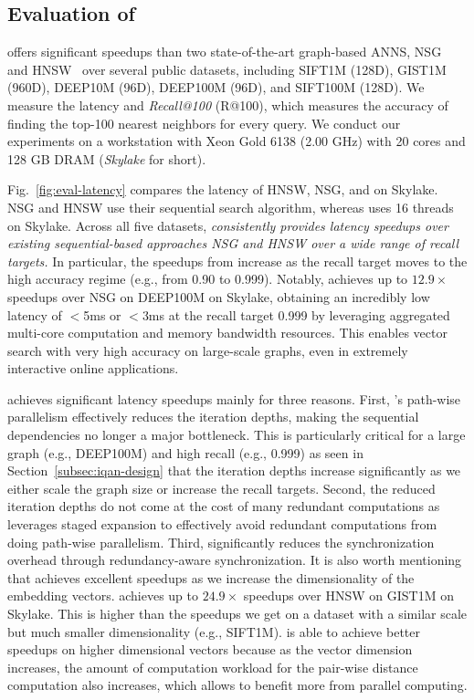 \subsection{Evaluation of \Hammer}
\label{subsec:iqan-eval}

\Hammer offers significant speedups than two state-of-the-art graph-based ANNS, NSG~\cite{NSGGithub,nsg} and HNSW~\cite{HNSWGithub,hnsw} over several public datasets, including SIFT1M (128D), GIST1M (960D), DEEP10M (96D), DEEP100M (96D), and SIFT100M (128D). We measure the latency and \emph{Recall@100} (R@100), which measures the accuracy of finding the top-100 nearest neighbors for every query.
We conduct our experiments on a workstation with Xeon Gold 6138 (2.00 GHz) with 20 cores and 128 GB DRAM (\emph{Skylake} for short). 

Fig.~\ref{fig:eval-latency} compares the latency of HNSW, NSG, and \Hammer on Skylake. NSG and HNSW use their sequential search algorithm, whereas \Hammer uses 16 threads on Skylake. Across all five datasets, \emph{\Hammer consistently provides latency speedups over existing sequential-based approaches NSG and HNSW over a wide range of recall targets. }
In particular, the speedups from \Hammer increase as the recall target moves to the high accuracy regime (e.g., from 0.90 to 0.999).
Notably, \Hammer achieves up to $12.9\times$ speedups over NSG on DEEP100M on Skylake, obtaining an incredibly low latency of $<$5ms or $<$3ms at the recall target 0.999 by leveraging aggregated multi-core computation and memory bandwidth resources. This enables vector search with very high accuracy on large-scale graphs, even in extremely interactive online applications. 

\Hammer achieves significant latency speedups mainly for three reasons. First, \Hammer's path-wise parallelism effectively reduces the iteration depths, making the sequential dependencies no longer a major bottleneck. This is particularly critical for a large graph (e.g., DEEP100M) and high recall (e.g., 0.999) as seen in Section~\ref{subsec:iqan-design} that the iteration depths increase significantly as we either scale the graph size or increase the recall targets. 
Second, the reduced iteration depths do not come at the cost of many redundant computations as \Hammer leverages staged expansion to effectively avoid redundant computations from doing path-wise parallelism. Third, \Hammer significantly reduces the synchronization overhead through redundancy-aware synchronization.
It is also worth mentioning that \Hammer achieves excellent speedups as we increase the dimensionality of the embedding vectors. \Hammer achieves up to $24.9\times$ speedups over HNSW on GIST1M on Skylake. This is higher than the speedups we get on a dataset with a similar scale but much smaller dimensionality (e.g., SIFT1M). \Hammer is able to achieve better speedups on higher dimensional vectors because as the vector dimension increases, the amount of computation workload for the pair-wise distance computation also increases, which allows \Hammer to benefit more from parallel computing. 

